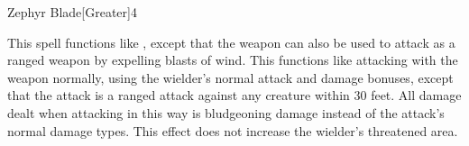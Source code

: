 \begin{spellsection}{Zephyr Blade}[Greater]{4}
    \begin{spellheader}
    \end{spellheader}
    \begin{spellcontent}
        \begin{spelltargetinginfo}
        \end{spelltargetinginfo}
        \begin{spelleffects}
            \spellspecial This spell functions like , except that the weapon can also be used to attack as a ranged weapon by expelling blasts of wind. This functions like attacking with the weapon normally, using the wielder's normal attack and damage bonuses, except that the attack is a ranged attack against any creature within 30 feet. All damage dealt when attacking in this way is bludgeoning damage instead of the attack's normal damage types. This effect does not increase the wielder's threatened area.
            \spelldur \durpersonallong
        \end{spelleffects}
    \end{spellcontent}
    \begin{spellfooter}
        \miscastexplode
    \end{spellfooter}
\end{spellsection}
